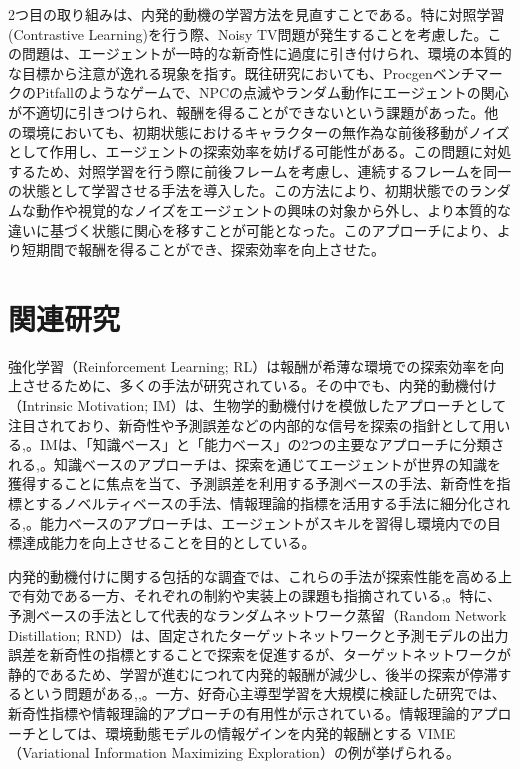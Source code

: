 2つ目の取り組みは、内発的動機の学習方法を見直すことである。特に対照学習(Contrastive Learning)を行う際、Noisy TV問題が発生することを考慮した。この問題は、エージェントが一時的な新奇性に過度に引き付けられ、環境の本質的な目標から注意が逸れる現象を指す。既往研究においても、ProcgenベンチマークのPitfallのようなゲームで、NPCの点滅やランダム動作にエージェントの関心が不適切に引きつけられ、報酬を得ることができないという課題があった。他の環境においても、初期状態におけるキャラクターの無作為な前後移動がノイズとして作用し、エージェントの探索効率を妨げる可能性がある。この問題に対処するため、対照学習を行う際に前後フレームを考慮し、連続するフレームを同一の状態として学習させる手法を導入した。この方法により、初期状態でのランダムな動作や視覚的なノイズをエージェントの興味の対象から外し、より本質的な違いに基づく状態に関心を移すことが可能となった。このアプローチにより、より短期間で報酬を得ることができ、探索効率を向上させた。

\section{関連研究}
強化学習（Reinforcement Learning; RL）は報酬が希薄な環境での探索効率を向上させるために、多くの手法が研究されている。その中でも、内発的動機付け（Intrinsic Motivation; IM）は、生物学的動機付けを模倣したアプローチとして注目されており、新奇性や予測誤差などの内部的な信号を探索の指針として用いる\cite{RL},\cite{IM}。IMは、「知識ベース」と「能力ベース」の2つの主要なアプローチに分類される\cite{IM2},\cite{IM3}。知識ベースのアプローチは、探索を通じてエージェントが世界の知識を獲得することに焦点を当て、予測誤差を利用する予測ベースの手法、新奇性を指標とするノベルティベースの手法、情報理論的指標を活用する手法に細分化される\cite{UCEIM},\cite{IMS}。能力ベースのアプローチは、エージェントがスキルを習得し環境内での目標達成能力を向上させることを目的としている\cite{CDE}。

内発的動機付けに関する包括的な調査では、これらの手法が探索性能を高める上で有効である一方、それぞれの制約や実装上の課題も指摘されている\cite{IMRL},\cite{IMRL2}。特に、予測ベースの手法として代表的なランダムネットワーク蒸留（Random Network Distillation; RND）は、固定されたターゲットネットワークと予測モデルの出力誤差を新奇性の指標とすることで探索を促進するが、ターゲットネットワークが静的であるため、学習が進むにつれて内発的報酬が減少し、後半の探索が停滞するという問題がある\cite{RND},\cite{IMRL},\cite{IMRL2}。一方、好奇心主導型学習を大規模に検証した研究では、新奇性指標や情報理論的アプローチの有用性が示されている\cite{CSL}。情報理論的アプローチとしては、環境動態モデルの情報ゲインを内発的報酬とする VIME（Variational Information Maximizing Exploration）の例が挙げられる\cite{VIME}。

